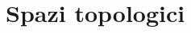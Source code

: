 \documentclass[a4paper,12pt]{article}
\author{Marco Costa}
\date{Anno 2015/2016}
\begin{document}
\maketitle %
\tableofcontents %
\section{Spazi topologici}
\end{document}
